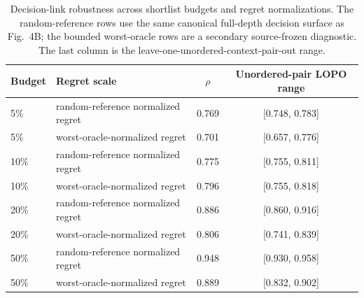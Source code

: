 \begin{table}[H]
\centering
\caption{Decision-link robustness across shortlist budgets and regret normalizations. The random-reference rows use the same canonical full-depth decision surface as Fig.~4B; the bounded worst-oracle rows are a secondary source-frozen diagnostic. The last column is the leave-one-unordered-context-pair-out range.}
\label{tab:decision-robustness}
\small
\begin{tabular}{llcc}
\toprule
Budget & Regret scale & $\rho$ & Unordered-pair LOPO range \\
\midrule
5\% & random-reference normalized regret & 0.769 & [0.748, 0.783] \\
5\% & worst-oracle-normalized regret & 0.701 & [0.657, 0.776] \\
10\% & random-reference normalized regret & 0.775 & [0.755, 0.811] \\
10\% & worst-oracle-normalized regret & 0.796 & [0.755, 0.818] \\
20\% & random-reference normalized regret & 0.886 & [0.860, 0.916] \\
20\% & worst-oracle-normalized regret & 0.806 & [0.741, 0.839] \\
50\% & random-reference normalized regret & 0.948 & [0.930, 0.958] \\
50\% & worst-oracle-normalized regret & 0.889 & [0.832, 0.902] \\
\bottomrule
\end{tabular}
\end{table}
